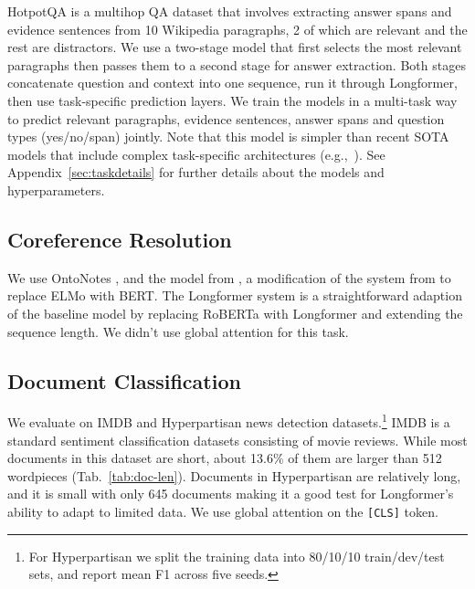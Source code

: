 \documentclass[11pt,a4paper]{article}
\newcommand{\model}{Longformer\xspace}
\begin{document}
HotpotQA is a multihop QA dataset that involves extracting answer spans and evidence sentences from 10 Wikipedia paragraphs, 2 of which are relevant and the rest are distractors. We use a two-stage model
that first selects the most relevant paragraphs then passes them to a second stage for answer extraction. Both stages concatenate question and context into one sequence, run it through \model, then use task-specific prediction layers. 
We train the models in a multi-task way to predict relevant paragraphs, evidence sentences, answer spans and question types (yes/no/span) jointly.
Note that this model is simpler than recent SOTA models that include complex task-specific architectures (e.g.,~\cite{Tu2019SelectAA,Chen2019MultihopQA,Tu2020GraphSN,quark2020}). 
See Appendix~\ref{sec:taskdetails} for further details about the models and hyperparameters.

















\subsection{Coreference Resolution}
We use OntoNotes \cite{pradhan-etal-2012-conll}, and the model from \citet{joshi-etal-2019-bert}, a modification of the system from \citet{lee-etal-2018-higher} to replace ELMo with BERT.
The \model system is a straightforward adaption of the baseline model by replacing RoBERTa with \model and extending the sequence length.
We didn't use global attention for this task. 

\subsection{Document Classification }
We evaluate on IMDB \cite{imdb} and Hyperpartisan news detection \cite{hyperpartisan} datasets.\footnote{For Hyperpartisan we split the training data into 80/10/10 train/dev/test sets, and report mean F1 across five seeds.} IMDB is a standard sentiment classification datasets consisting of movie reviews. While most documents in this dataset are short, about 13.6\% of them are larger than 512 wordpieces (Tab.~\ref{tab:doc-len}).
Documents in Hyperpartisan are relatively long, and it is small with only 645 documents making it a good test for \model's ability to adapt to limited data. We use global attention 
on the \texttt{[CLS]} token. 
\end{document}
